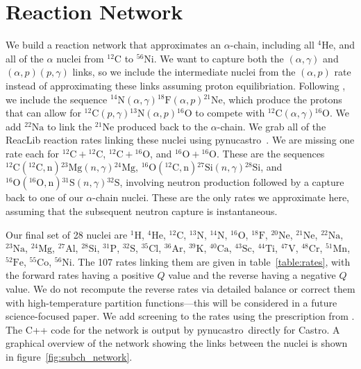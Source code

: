 \documentclass[linenumbers]{aastex631}
\newcommand{\castro}{{\sf Castro}}
\newcommand{\pynucastro}{{\sf pynucastro}}
\newcommand{\isotm}[2]{{}^{#2}\mathrm{#1}}
\begin{document}
\section{Reaction Network}
\label{sec:app:reactionnet}
We build a reaction network that approximates an $\alpha$-chain,
including all $\isotm{He}{4}$, and all of the $\alpha$ nuclei from
$\isotm{C}{12}$ to $\isotm{Ni}{56}$.  We want to capture both the
$(\alpha,\gamma)$ and $(\alpha,p)(p,\gamma)$ links, so we include the
intermediate nuclei from the $(\alpha,p)$ rate instead of
approximating these links assuming proton equilibriation.  Following
\citet{shenbildsten}, we include the sequence
$\isotm{N}{14}(\alpha,\gamma)\isotm{F}{18}(\alpha, p)\isotm{Ne}{21}$,
which produce the protons that can allow for $\isotm{C}{12}(p,
\gamma)\isotm{N}{13}(\alpha, p)\isotm{O}{16}$ to compete with
$\isotm{C}{12}(\alpha,\gamma)\isotm{O}{16}$.  We add $\isotm{Na}{22}$
to link the $\isotm{Ne}{21}$ produced back to the $\alpha$-chain.  We
grab all of the ReacLib \citep{reaclib} reaction rates linking these
nuclei using \pynucastro~\citep{pynucastro}.  We are missing one rate
each for $\isotm{C}{12} + \isotm{C}{12}$, $\isotm{C}{12} +
\isotm{O}{16}$, and $\isotm{O}{16} + \isotm{O}{16}$.  These are
the sequences $\isotm{C}{12}(\isotm{C}{12}, \mathrm{n})\isotm{Mg}{23}(n, \gamma)\isotm{Mg}{24}$,
$\isotm{O}{16}(\isotm{C}{12}, \mathrm{n})\isotm{Si}{27}(n, \gamma)\isotm{Si}{28}$, and
$\isotm{O}{16}(\isotm{O}{16}, \mathrm{n})\isotm{S}{31}(n, \gamma)\isotm{S}{32}$, involving neutron
production followed by a capture back to one of our $\alpha$-chain
nuclei.  These are the only rates we approximate here, assuming
that the subsequent neutron capture is instantaneous.

Our final set of 28 nuclei are ${}^{1}\mathrm{H}$, ${}^{4}\mathrm{He}$,
${}^{12}\mathrm{C}$, ${}^{13}\mathrm{N}$, ${}^{14}\mathrm{N}$,
${}^{16}\mathrm{O}$, ${}^{18}\mathrm{F}$, ${}^{20}\mathrm{Ne}$,
${}^{21}\mathrm{Ne}$, ${}^{22}\mathrm{Na}$, ${}^{23}\mathrm{Na}$,
${}^{24}\mathrm{Mg}$, ${}^{27}\mathrm{Al}$, ${}^{28}\mathrm{Si}$,
${}^{31}\mathrm{P}$, ${}^{32}\mathrm{S}$, ${}^{35}\mathrm{Cl}$,
${}^{36}\mathrm{Ar}$, ${}^{39}\mathrm{K}$, ${}^{40}\mathrm{Ca}$,
${}^{43}\mathrm{Sc}$, ${}^{44}\mathrm{Ti}$, ${}^{47}\mathrm{V}$,
${}^{48}\mathrm{Cr}$, ${}^{51}\mathrm{Mn}$, ${}^{52}\mathrm{Fe}$,
${}^{55}\mathrm{Co}$, ${}^{56}\mathrm{Ni}$.  The 107 rates linking them are
given in table~\ref{table:rates}, with the forward rates having a positive $Q$
value and the reverse having a negative $Q$ value.  We do not recompute the reverse
rates via detailed balance or correct them with high-temperature partition functions---this will be considered in a future science-focused paper.  We add screening to the
rates using the prescription from \citet{graboske:1973,alastuey:1978,itoh:1979}.
The C++ code for the network is output by \pynucastro\ directly for \castro.  A
graphical overview of the network showing the links between the nuclei is shown
in figure~\ref{fig:subch_network}.
\end{document}
